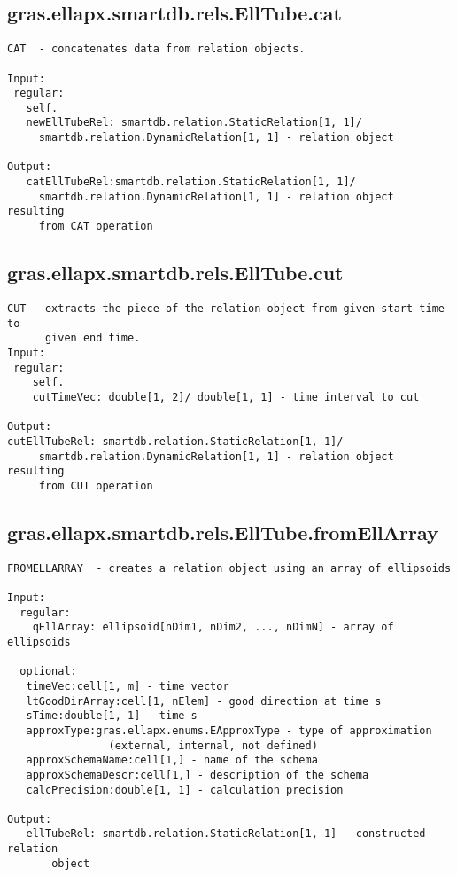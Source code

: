 \subsection{\texorpdfstring{gras.ellapx.smartdb.rels.EllTube.cat}{cat}}\label{method:gras.ellapx.smartdb.rels.EllTube.cat}
\begin{verbatim}
CAT  - concatenates data from relation objects.

Input:
 regular:
   self.
   newEllTubeRel: smartdb.relation.StaticRelation[1, 1]/
     smartdb.relation.DynamicRelation[1, 1] - relation object

Output:
   catEllTubeRel:smartdb.relation.StaticRelation[1, 1]/
     smartdb.relation.DynamicRelation[1, 1] - relation object resulting
     from CAT operation
\end{verbatim}
\subsection{\texorpdfstring{gras.ellapx.smartdb.rels.EllTube.cut}{cut}}\label{method:gras.ellapx.smartdb.rels.EllTube.cut}
\begin{verbatim}
CUT - extracts the piece of the relation object from given start time to
      given end time.
Input:
 regular:
    self.
    cutTimeVec: double[1, 2]/ double[1, 1] - time interval to cut

Output:
cutEllTubeRel: smartdb.relation.StaticRelation[1, 1]/
     smartdb.relation.DynamicRelation[1, 1] - relation object resulting
     from CUT operation
\end{verbatim}
\subsection{\texorpdfstring{gras.ellapx.smartdb.rels.EllTube.fromEllArray}{fromEllArray}}\label{method:gras.ellapx.smartdb.rels.EllTube.fromEllArray}
\begin{verbatim}
FROMELLARRAY  - creates a relation object using an array of ellipsoids

Input:
  regular:
    qEllArray: ellipsoid[nDim1, nDim2, ..., nDimN] - array of ellipsoids

  optional:
   timeVec:cell[1, m] - time vector
   ltGoodDirArray:cell[1, nElem] - good direction at time s
   sTime:double[1, 1] - time s
   approxType:gras.ellapx.enums.EApproxType - type of approximation
                (external, internal, not defined)
   approxSchemaName:cell[1,] - name of the schema
   approxSchemaDescr:cell[1,] - description of the schema
   calcPrecision:double[1, 1] - calculation precision

Output:
   ellTubeRel: smartdb.relation.StaticRelation[1, 1] - constructed relation
       object
\end{verbatim}
